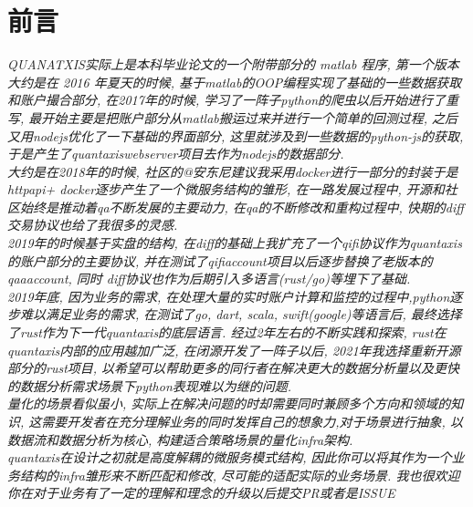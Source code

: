 \documentclass{scrartcl}
\numberwithin{equation}{section}
\begin{document}
\maketitle
\lhead{}
\chead{}
\cfoot{}
\rfoot{\thepage}

\setlength{\hoffset}{0mm}
\setlength{\voffset}{0mm}
\newpage
\renewcommand{\headrulewidth}{0.4pt}
\renewcommand{\footrulewidth}{0.4pt}
\setcounter{secnumdepth}{3}
\setcounter{tocdepth}{3}

\tableofcontents
\etocsettocstyle{\subsection*{\contentsname}}{}

\newpage
\section{前言}
\textsl{QUANATXIS实际上是本科毕业论文的一个附带部分的 matlab 程序, 第一个版本大约是在 2016 年夏天的时候, 基于matlab的OOP编程实现了基础的一些数据获取和账户撮合部分, 在2017年的时候, 学习了一阵子python的爬虫以后开始进行了重写, 最开始主要是把账户部分从matlab搬运过来并进行一个简单的回测过程, 之后又用nodejs优化了一下基础的界面部分, 这里就涉及到一些数据的python-js的获取, 于是产生了quantaxiswebserver项目去作为nodejs的数据部分.\\ 大约是在2018年的时候, 社区的@安东尼建议我采用docker进行一部分的封装于是 httpapi+ docker逐步产生了一个微服务结构的雏形, 在一路发展过程中, 开源和社区始终是推动着qa不断发展的主要动力, 在qa的不断修改和重构过程中, 快期的diff交易协议也给了我很多的灵感.\\ 2019年的时候基于实盘的结构, 在diff的基础上我扩充了一个qifi协议作为quantaxis的账户部分的主要协议, 并在测试了qifiaccount项目以后逐步替换了老版本的qaaaccount, 同时 diff协议也作为后期引入多语言(rust/go)等埋下了基础. \\2019年底, 因为业务的需求, 在处理大量的实时账户计算和监控的过程中,python逐步难以满足业务的需求, 在测试了go, dart, scala, swift(google)等语言后, 最终选择了rust作为下一代quantaxis的底层语言. 经过2年左右的不断实践和探索, rust在quantaxis内部的应用越加广泛, 在闭源开发了一阵子以后, 2021年我选择重新开源部分的rust项目, 以希望可以帮助更多的同行者在解决更大的数据分析量以及更快的数据分析需求场景下python表现难以为继的问题.\\ 量化的场景看似虽小, 实际上在解决问题的时却需要同时兼顾多个方向和领域的知识, 这需要开发者在充分理解业务的同时发挥自己的想象力,对于场景进行抽象, 以数据流和数据分析为核心, 构建适合策略场景的量化infra架构. \\quantaxis在设计之初就是高度解耦的微服务模式结构, 因此你可以将其作为一个业务结构的infra雏形来不断匹配和修改, 尽可能的适配实际的业务场景. 我也很欢迎你在对于业务有了一定的理解和理念的升级以后提交PR或者是ISSUE}
\end{document}

